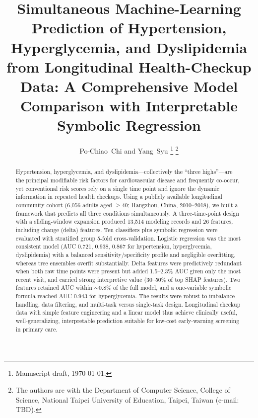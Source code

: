 \documentclass[journal]{IEEEtran}
\begin{document}
\title{Simultaneous Machine-Learning Prediction of Hypertension, Hyperglycemia, and Dyslipidemia from Longitudinal Health-Checkup Data: A Comprehensive Model Comparison with Interpretable Symbolic Regression}

\author{Po-Chiao~Chi and Yang~Syu%
\thanks{Manuscript draft, \today.}
\thanks{The authors are with the Department of Computer Science, College of Science, National Taipei University of Education, Taipei, Taiwan (e-mail: TBD).}}


\maketitle

\begin{abstract}
Hypertension, hyperglycemia, and dyslipidemia---collectively the ``three highs''---are the principal modifiable risk factors for cardiovascular disease and frequently co-occur, yet conventional risk scores rely on a single time point and ignore the dynamic information in repeated health checkups. Using a publicly available longitudinal community cohort (6,056 adults aged $\geq$40; Hangzhou, China, 2010--2018), we built a framework that predicts all three conditions simultaneously. A three-time-point design with a sliding-window expansion produced 13,514 modeling records and 26 features, including change (delta) features. Ten classifiers plus symbolic regression were evaluated with stratified group 5-fold cross-validation. Logistic regression was the most consistent model (AUC 0.721, 0.938, 0.867 for hypertension, hyperglycemia, dyslipidemia) with a balanced sensitivity/specificity profile and negligible overfitting, whereas tree ensembles overfit substantially. Delta features were predictively redundant when both raw time points were present but added 1.5--2.3\% AUC given only the most recent visit, and carried strong interpretive value (30--50\% of top SHAP features). Two features retained AUC within $\sim$0.8\% of the full model, and a one-variable symbolic formula reached AUC 0.943 for hyperglycemia. The results were robust to imbalance handling, data filtering, and multi-task versus single-task design. Longitudinal checkup data with simple feature engineering and a linear model thus achieve clinically useful, well-generalizing, interpretable prediction suitable for low-cost early-warning screening in primary care.
\end{abstract}
\end{document}
